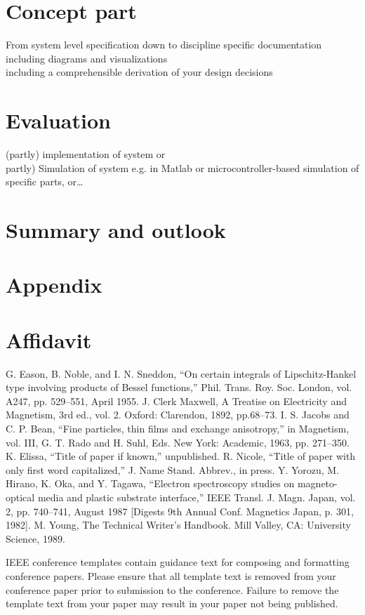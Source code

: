 \documentclass[conference]{IEEEtran}
\begin{document}
\section{Concept part}
From system level specification down to discipline specific
documentation including diagrams and visualizations \\
including a comprehensible derivation of your design decisions

\section{Evaluation}
(partly) implementation of system or\\
partly) Simulation of system e.g. in Matlab or microcontroller-based
simulation of specific parts, or…

\section{Summary and outlook}

\section{Appendix}

\section{Affidavit}

\begin{thebibliography}{00}
 G. Eason, B. Noble, and I. N. Sneddon, ``On certain integrals of Lipschitz-Hankel type involving products of Bessel functions,'' Phil. Trans. Roy. Soc. London, vol. A247, pp. 529--551, April 1955.
 J. Clerk Maxwell, A Treatise on Electricity and Magnetism, 3rd ed., vol. 2. Oxford: Clarendon, 1892, pp.68--73.
 I. S. Jacobs and C. P. Bean, ``Fine particles, thin films and exchange anisotropy,'' in Magnetism, vol. III, G. T. Rado and H. Suhl, Eds. New York: Academic, 1963, pp. 271--350.
 K. Elissa, ``Title of paper if known,'' unpublished.
 R. Nicole, ``Title of paper with only first word capitalized,'' J. Name Stand. Abbrev., in press.
 Y. Yorozu, M. Hirano, K. Oka, and Y. Tagawa, ``Electron spectroscopy studies on magneto-optical media and plastic substrate interface,'' IEEE Transl. J. Magn. Japan, vol. 2, pp. 740--741, August 1987 [Digests 9th Annual Conf. Magnetics Japan, p. 301, 1982].
 M. Young, The Technical Writer's Handbook. Mill Valley, CA: University Science, 1989.
\end{thebibliography}
\vspace{12pt}
\color{red}
IEEE conference templates contain guidance text for composing and formatting conference papers. Please ensure that all template text is removed from your conference paper prior to submission to the conference. Failure to remove the template text from your paper may result in your paper not being published.
\end{document}
